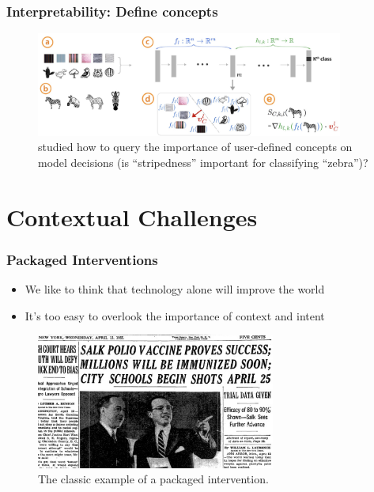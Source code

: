\documentclass[10pt,mathserif]{beamer}
\begin{document}

\begin{frame}
  \frametitle{Interpretability: Define concepts}
  \begin{figure}[ht]
    \centering
    \includegraphics[width=0.9\textwidth]{figures/concepts}
    \caption{\citep{kim2017interpretability} studied how to query the importance
      of user-defined concepts on model decisions (is ``stripedness'' important
      for classifying ``zebra'')?}
  \end{figure}
\end{frame}

\section{Contextual Challenges}
\label{sec:label}

\begin{frame}
  \frametitle{Packaged Interventions}
  \begin{itemize}
  \item We like to think that technology alone will improve the world
  \item It's too easy to overlook the importance of context and intent
  \end{itemize}
  \begin{figure}[ht]
    \centering
    \includegraphics[width=0.7\textwidth]{figures/vaccine}
    \caption{The classic example of a packaged intervention. \label{fig:label}}
  \end{figure}
\end{frame}
\end{document}
